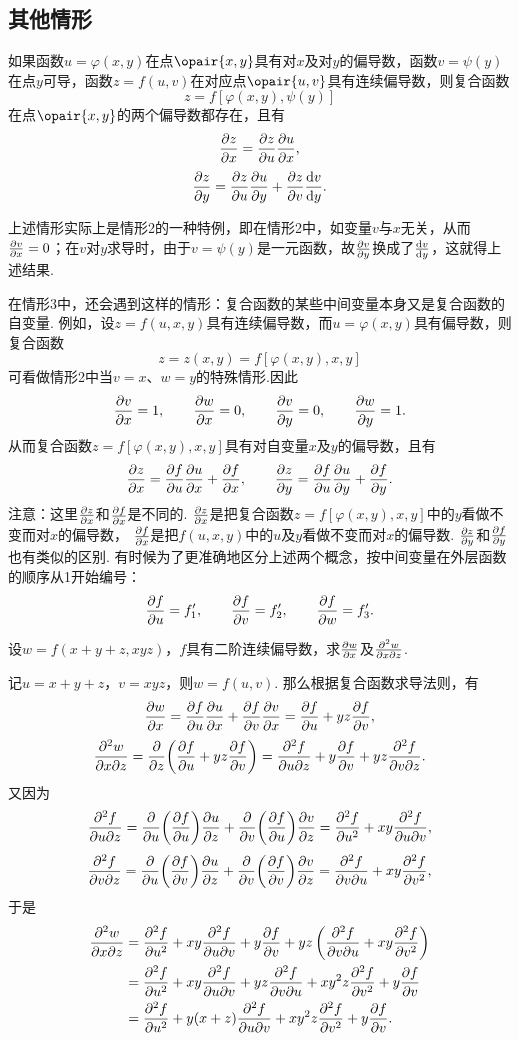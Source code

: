 \subsection{其他情形}
\begin{theorem}
如果函数\(u=\varphi(x,y)\)在点\(\opair{x,y}\)具有对\(x\)及对\(y\)的偏导数，函数\(v=\psi(y)\)在点\(y\)可导，函数\(z=f(u,v)\)在对应点\(\opair{u,v}\)具有连续偏导数，则复合函数\[
z = f[\varphi(x,y),\psi(y)]
\]在点\(\opair{x,y}\)的两个偏导数都存在，且有\[
\pdv{z}{x} = \pdv{z}{u} \pdv{u}{x},
\]\[
\pdv{z}{y} = \pdv{z}{u} \pdv{u}{y} + \pdv{z}{v} \dv{v}{y}.
\]
\end{theorem}
上述情形实际上是情形2的一种特例，即在情形2中，如变量\(v\)与\(x\)无关，从而\(\pdv{v}{x}=0\)；在\(v\)对\(y\)求导时，由于\(v=\psi(y)\)是一元函数，故\(\pdv{v}{y}\)换成了\(\dv{v}{y}\)，这就得上述结果.

在情形3中，还会遇到这样的情形：复合函数的某些中间变量本身又是复合函数的自变量.
例如，设\(z = f(u,x,y)\)具有连续偏导数，而\(u=\varphi(x,y)\)具有偏导数，则复合函数\[
z = z(x,y) = f[\varphi(x,y),x,y]
\]可看做情形2中当\(v=x\)、\(w=y\)的特殊情形.因此\[
\pdv{v}{x} = 1, \qquad \pdv{w}{x} = 0,
\qquad
\pdv{v}{y} = 0, \qquad \pdv{w}{y} = 1.
\]从而复合函数\(z = f[\varphi(x,y),x,y]\)具有对自变量\(x\)及\(y\)的偏导数，且有\[
\pdv{z}{x} = \pdv{f}{u} \pdv{u}{x} + \pdv{f}{x},
\qquad
\pdv{z}{y} = \pdv{f}{u} \pdv{u}{y} + \pdv{f}{y}.
\]
注意：这里\(\pdv{z}{x}\)和\(\pdv{f}{x}\)是不同的.
\(\pdv{z}{x}\)是把复合函数\(z = f[\varphi(x,y),x,y]\)中的\(y\)看做不变而对\(x\)的偏导数，%
\(\pdv{f}{x}\)是把\(f(u,x,y)\)中的\(u\)及\(y\)看做不变而对\(x\)的偏导数.
\(\pdv{z}{y}\)和\(\pdv{f}{y}\)也有类似的区别.
有时候为了更准确地区分上述两个概念，按中间变量在外层函数的顺序从1开始编号：\[
\pdv{f}{u} = f_1', \qquad
\pdv{f}{v} = f_2', \qquad
\pdv{f}{w} = f_3'.
\]

\begin{example}
设\(w = f(x+y+z,xyz)\)，\(f\)具有二阶连续偏导数，求\(\pdv{w}{x}\)及\(\pdv[2]{w}{x}{z}\).
\begin{solution}
记\(u = x+y+z\)，\(v = xyz\)，则\(w = f(u,v)\).
那么根据复合函数求导法则，有\[
\pdv{w}{x} = \pdv{f}{u} \pdv{u}{x} + \pdv{f}{v} \pdv{v}{x}
= \pdv{f}{u} + yz \pdv{f}{v},
\]\[
\pdv[2]{w}{x}{z} = \pdv{z}(\pdv{f}{u} + yz \pdv{f}{v})
= \pdv[2]{f}{u}{z} + y\pdv{f}{v} + yz \pdv[2]{f}{v}{z}.
\]又因为\[
\pdv[2]{f}{u}{z}
= \pdv{u}(\pdv{f}{u}) \pdv{u}{z} + \pdv{v}(\pdv{f}{u}) \pdv{v}{z}
= \pdv[2]{f}{u} + xy \pdv[2]{f}{u}{v},
\]\[
\pdv[2]{f}{v}{z}
= \pdv{u}(\pdv{f}{v}) \pdv{u}{z} + \pdv{v}(\pdv{f}{v}) \pdv{v}{z}
= \pdv[2]{f}{v}{u} + xy \pdv[2]{f}{v},
\]于是\begin{align*}
\pdv[2]{w}{x}{z}
&= \pdv[2]{f}{u} + xy \pdv[2]{f}{u}{v}
 + y\pdv{f}{v} + yz \left( \pdv[2]{f}{v}{u} + xy \pdv[2]{f}{v} \right) \\
&= \pdv[2]{f}{u}
 + xy \pdv[2]{f}{u}{v} + yz \pdv[2]{f}{v}{u}
 + x y^2 z \pdv[2]{f}{v}
 + y \pdv{f}{v} \\
&= \pdv[2]{f}{u}
 + y(x+z) \pdv[2]{f}{u}{v}
 + x y^2 z \pdv[2]{f}{v}
 + y \pdv{f}{v}.
\end{align*}
\end{solution}
\end{example}


